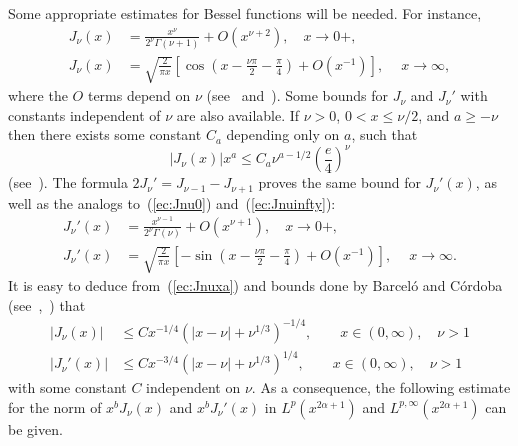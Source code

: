 \documentclass{amsart}
\theoremstyle{plain}
\begin{document}
Some appropriate estimates for Bessel functions will be needed.
For instance,
\begin{align}
\label{ec:Jnu0}
   J_\nu(x) &= \frac{x^\nu}{2^\nu \Gamma(\nu+1)} + O(x^{\nu+2}),
   \quad  x\to 0+,
   \\
\label{ec:Jnuinfty}
   J_\nu(x) &= \sqrt{\frac2{\pi x}}
   \left[\cos\left(x-\frac{\nu\pi}2-\frac\pi4\right) + O(x^{-1})\right],
   \ \quad x\to \infty,
\end{align}
where the $O$ terms depend on $\nu$ (see~\cite[\S~3.1~(8),
p.~40]{W} and~\cite[\S~7.21~(1), p.~199]{W}). Some bounds for $J_\nu$ and
$J_\nu'$ with constants independent of $\nu$ are also available.
If $\nu > 0$, $0 < x \leq \nu/2$, and $a \geq -\nu$ then there exists some
constant $C_a$ depending only on $a$, such that
\begin{equation}
\label{ec:Jnuxa}
   |J_\nu(x)| x^a \le C_a \nu^{a-1/2} \left(\frac{e}{4}\right)^\nu
\end{equation}
(see~\cite[\S~3.31, p.~49]{W}). The formula $2 J_\nu' = J_{\nu-1} -
J_{\nu+1}$ proves the same bound for $J_\nu'(x)$, as well as the analogs
to~(\ref{ec:Jnu0}) and~(\ref{ec:Jnuinfty}):
\begin{align*}
   J_\nu'(x) &= \frac{x^{\nu-1}}{2^\nu \Gamma(\nu)} + O(x^{\nu+1}),
   \quad  x\to 0+,
   \\
   J_\nu'(x) &= \sqrt{\frac2{\pi x}}
   \left[-\sin\left(x-\frac{\nu\pi}2-\frac\pi4\right) + O(x^{-1})\right],
   \ \quad x\to \infty.
\end{align*}
It is easy to deduce from~(\ref{ec:Jnuxa}) and bounds done by Barcel\'o and
C\'ordoba (see~\cite[p.~661]{BC},~\cite[p.~24]{Co}) that
\begin{align}
\label{ec:Jnu}
   |J_\nu(x)| &\le C x^{-1/4} \left( |x - \nu| + \nu^{1/3} \right)^{-1/4},
   \qquad x \in (0,\infty),
   \quad \nu > 1
   \\
\label{ec:Jnu'}
   |J_\nu'(x)| &\le C x^{-3/4} \left( |x - \nu| + \nu^{1/3} \right)^{1/4},
   \qquad x \in (0,\infty),
   \quad \nu > 1
\end{align}
with some constant $C$ independent on $\nu$.
As a consequence, the following estimate for the norm of $x^b J_\nu(x)$ and
$x^b J_\nu'(x)$ in $L^p(x^{2\alpha+1})$ and $L^{p,\infty}(x^{2\alpha+1})$ can
be given.
\end{document}
